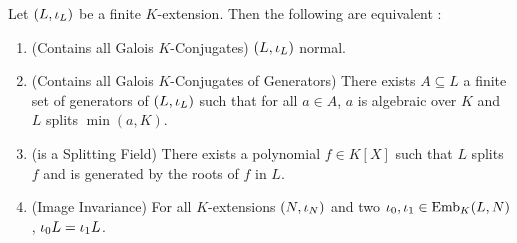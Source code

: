 \documentclass[main.tex]{subfiles}
\begin{document}
\begin{thm} 
  
  Let $(L,\iota_L)$ be a finite $K$-extension.
  Then the following are equivalent : 
  \begin{enumerate}
    \item (Contains all Galois $K$-Conjugates) $(L,\iota_L)$ normal. 
    \item (Contains all Galois $K$-Conjugates of Generators) 
    There exists $A \subseteq L$ a finite set of generators of $(L,\iota_L)$
    such that for all $a \in A$, 
    $a$ is algebraic over $K$ and $L$ splits $\min(a,K)$. 
    \item (is a Splitting Field) 
    There exists a polynomial $f \in K[X]$ such that
    $L$ splits $f$ and is generated by the roots of $f$ in $L$.
    \item (Image Invariance) For all $K$-extensions $(N,\iota_N)$
    and two $\iota_0, \iota_1 \in \mathrm{Emb}_{K}(L, N)$, 
    $\iota_0 L = \iota_1 L$.
  \end{enumerate}
\end{thm}
\end{document}
